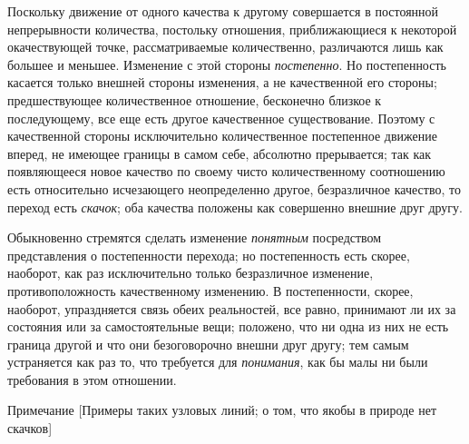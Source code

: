 Поскольку движение от одного качества к другому совершается в постоянной
непрерывности количества, постольку отношения, приближающиеся к некоторой
окачествующей точке, рассматриваемые количественно, различаются лишь как
большее и меньшее. Изменение с этой стороны
{\em постепенно}. Но постепенность касается только
внешней стороны изменения, а не качественной его стороны; предшествующее
количественное отношение, бесконечно близкое к последующему, все еще есть
другое качественное существование. Поэтому с качественной стороны
исключительно количественное постепенное движение вперед, не имеющее
границы в самом себе, абсолютно прерывается; так как появляющееся новое
качество по своему чисто количественному соотношению есть относительно
исчезающего неопределенно другое, безразличное качество, то переход есть
{\em скачок}; оба качества положены как совершенно
внешние друг другу.

Обыкновенно стремятся сделать изменение {\em понятным}
посредством представления о постепенности перехода; но постепенность есть
скорее, наоборот, как раз исключительно только безразличное изменение,
противоположность качественному изменению. В постепенности, скорее,
наоборот, упраздняется связь обеих реальностей, все равно, принимают ли их
за состояния или за самостоятельные вещи; положено, что ни одна из них не
есть граница другой и что они безоговорочно внешни друг другу; тем самым
устраняется как раз то, что требуется для
{\em понимания}, как бы малы ни были требования в этом
отношении.

{\centering
Примечание
[Примеры таких узловых линий; о том, что якобы в природе нет скачков]
\par}

